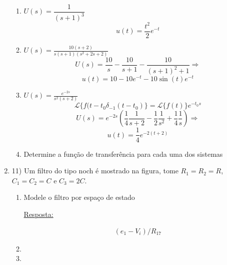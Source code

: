 \documentclass[a4paper, 12pt]{article}
\begin{document}
\begin{enumerate}
\begin{enumerate}
\item $U(s)  = \dfrac{1}{(s+1)^3}$
 \[u(t) = \frac{t^2}{2}e^{-t}\]

\item $U(s) = \frac{10(s+2)}{s(s+1)(s^2+2s+2)}$
 \[U(s) = \frac{10}{s}-\frac{10}{s+1}-\frac{10}{(s+1)^2+1}\Rightarrow\]
 \[u(t) = 10-10e^{-t}-10\sin(t)e^{-t}\]
\item $U(s) = \frac{e^{-2s}}{s^2(s+2)}$
 \[\mathcal{L}\{f(t-t_0\delta_{-1}(t-t_0)\} = \mathcal{L}\{f(t)\}e^{-t_0s} \]
 \[U(s) =
e^{-2s}\left(\frac{1}{4}\frac{1}{s+2}-\frac{1}{2}\frac{1}{s^2}+\frac{1}{4}\frac{1}{s}\right)\Rightarrow\]
 \[u(t) = \frac{1}{4}e^{-2(t+2)}\]

\item Determine a função de transferência para cada uma dos sistemas
\end{enumerate}




\item 11) Um filtro do tipo noch é mostrado na figura, tome $R_1=R_2=R$,$C_1=C_2=C$ e $C_3=2C$.
\begin{enumerate}
\item Modele o filtro por espaço de estado

\underline{Resposta:}

\[\begin{array}{|c|c|}
(e_1-V_i)/R_17
\end{array}\]


\item
\item 
\end{enumerate}








\end{enumerate}
\end{document}
